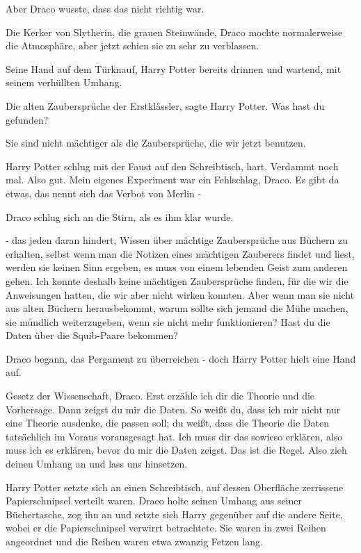 Aber Draco wusste, dass das nicht richtig war.

Die Kerker von Slytherin, die grauen Steinwände, Draco mochte normalerweise die
Atmosphäre, aber jetzt schien sie zu sehr zu verblassen.

Seine Hand auf dem Türknauf, Harry Potter bereits drinnen und wartend, mit
seinem verhüllten Umhang.

\glqq{}Die alten Zaubersprüche der Erstklässler\grqq{}, sagte Harry Potter. \glqq
Was hast du gefunden?\grqq{}

\glqq{}Sie sind nicht mächtiger als die Zaubersprüche, die wir jetzt
benutzen.\grqq{}

Harry Potter schlug mit der Faust auf den Schreibtisch, hart. \glqq{}Verdammt
noch mal. Also gut. Mein eigenes Experiment war ein Fehlschlag, Draco. Es gibt
da etwas, das nennt sich das Verbot von Merlin -\grqq{}

Draco schlug sich an die Stirn, als es ihm klar wurde.

\glqq{}- das jeden daran hindert, Wissen über mächtige Zaubersprüche aus Büchern
zu erhalten, selbst wenn man die Notizen eines mächtigen Zauberers findet und
liest, werden sie keinen Sinn ergeben, es muss von einem lebenden Geist zum
anderen gehen. Ich konnte deshalb keine mächtigen Zaubersprüche finden, für die
wir die Anweisungen hatten, die wir aber nicht wirken konnten. Aber wenn man sie
nicht aus alten Büchern herausbekommt, warum sollte sich jemand die Mühe machen,
sie mündlich weiterzugeben, wenn sie nicht mehr funktionieren? Hast du die Daten
über die Squib-Paare bekommen?\grqq{}

Draco begann, das Pergament zu überreichen - doch Harry Potter hielt eine Hand
auf.

\glqq{}Gesetz der Wissenschaft, Draco. Erst erzähle ich dir die Theorie und die
Vorhersage. Dann zeigst du mir die Daten. So weißt du, dass ich mir nicht nur
eine Theorie ausdenke, die passen soll; du weißt, dass die Theorie die Daten
tatsächlich im Voraus vorausgesagt hat. Ich muss dir das sowieso erklären, also
muss ich es erklären, bevor du mir die Daten zeigst. Das ist die Regel. Also
zieh deinen Umhang an und lass uns hinsetzen.\grqq{}

Harry Potter setzte sich an einen Schreibtisch, auf dessen Oberfläche zerrissene
Papierschnipsel verteilt waren. Draco holte seinen Umhang aus seiner
Büchertasche, zog ihn an und setzte sich Harry gegenüber auf die andere Seite,
wobei er die Papierschnipsel verwirrt betrachtete. Sie waren in zwei Reihen
angeordnet und die Reihen waren etwa zwanzig Fetzen lang.

